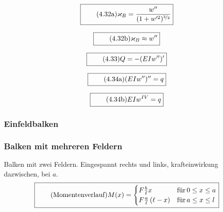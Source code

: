 \documentclass[11pt]{article}
\newcommand{\1}{ {\mathds{1}} }
\begin{document}
\begin{multicols}{2}
		\begin{equation}
			\boxed{
				\tag{4.32a}
				\begin{split}
					\varkappa_B = \frac{w''}{(1 + w'^2)^{\nicefrac{3}{2}} }
				\end{split}
			}
		\end{equation}

		\begin{equation}
			\boxed{
				\tag{4.32b}
				\begin{split}
					\varkappa_B\approx w''
				\end{split}
			}
		\end{equation}
		
		\begin{equation}
			\boxed{
				\tag{4.33}
				\begin{split}
					Q = -(E I w'')'
				\end{split}
			}
		\end{equation}

		\begin{equation}
			\boxed{
				\tag{4.34a}
				\begin{split}
					(E I w'')'' = q
				\end{split}
			}
		\end{equation}

		\begin{equation}
			\boxed{
				\tag{4.34b}
				\begin{split}
					EI w^{I V} = q
				\end{split}
			}
		\end{equation}
		
		\subsubsection{Einfeldbalken}
		\subsubsection{Balken mit mehreren Feldern}

		Balken mit zwei Feldern. Eingespannt rechts und links, krafteinwirkung dazwischen, bei $a$. 
		\begin{equation}
			\boxed{
				\tag{Momentenverlauf}
				\begin{split}
					M(x) = 
					\begin{cases}
						F\frac{b}{\ell}x &\text{für} \, 0 \leq x \leq a\\
						F\frac{a}{\ell}\left(\ell -x\right) &\text{für}\, a \leq x \leq l
					\end{cases}
				\end{split}
			}
		\end{equation}


\end{multicols}
\end{document}
